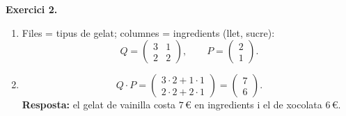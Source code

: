 \documentclass[12pt,a4paper]{article}
\newcommand{\blocInici}{%
  \par\nobreak\vspace{0pt}%
  \begin{minipage}[t]{\linewidth}%
}
\newcommand{\blocFi}{%
  \end{minipage}%
  \par
}
\begin{document}
\vspace{0.5em}

%
\blocInici
\noindent\textbf{Exercici 2.}
\begin{enumerate}[label=\alph*),leftmargin=1.2em,itemsep=0.35em]
  \item Files = tipus de gelat; columnes = ingredients (llet, sucre):
    \[
      Q =
      \begin{pmatrix}
        3 & 1 \\
        2 & 2
      \end{pmatrix},
      \qquad
      P =
      \begin{pmatrix} 2 \\ 1 \end{pmatrix}.
    \]
  \item
    \[
      Q \cdot P =
      \begin{pmatrix}
        3\cdot 2 + 1\cdot 1 \\
        2\cdot 2 + 2\cdot 1
      \end{pmatrix}
      =
      \begin{pmatrix} 7 \\ 6 \end{pmatrix}.
    \]
    \textbf{Resposta:} el gelat de vainilla costa $7$\,\euro{} en ingredients
    i el de xocolata $6$\,\euro{}.
\end{enumerate}
\blocFi

\vspace{0.7em}
\end{document}
